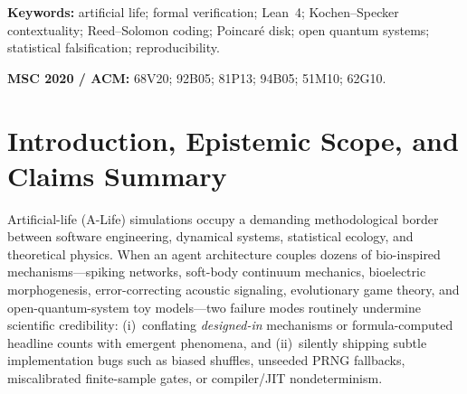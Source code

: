 \documentclass[11pt,a4paper]{article}
\numberwithin{equation}{section}
\theoremstyle{plain}
\theoremstyle{definition}
\theoremstyle{remark}
\newcommand{\code}[1]{{\ttfamily\footnotesize\def\_{\textunderscore\penalty0\hskip0pt}#1}}
\begin{document}
\begin{abstract}
\begin{enumerate}[leftmargin=1.8em,itemsep=2pt]
  \item \emph{Strict Epistemic Honesty:} A systematic cross-check against all $1{,}900$ open problems in \code{0thernes/unsolved-problems-mega-atlas} establishes honestly that Glitchling solves \emph{zero} ($0/1{,}900$) open problems. No claims of consciousness, sentience, AGI, or physical quantum biology are made.
\end{enumerate}
\end{abstract}

\medskip
\noindent\textbf{Keywords:} artificial life; formal verification; Lean~4; Kochen--Specker contextuality; Reed--Solomon coding; Poincar\'e disk; open quantum systems; statistical falsification; reproducibility.

\smallskip
\noindent\textbf{MSC 2020 / ACM:} 68V20; 92B05; 81P13; 94B05; 51M10; 62G10.

\tableofcontents

\section{Introduction, Epistemic Scope, and Claims Summary}
\label{sec:intro}

Artificial-life (A-Life) simulations occupy a demanding methodological border between software engineering, dynamical systems, statistical ecology, and theoretical physics. When an agent architecture couples dozens of bio-inspired mechanisms---spiking networks, soft-body continuum mechanics, bioelectric morphogenesis, error-correcting acoustic signaling, evolutionary game theory, and open-quantum-system toy models---two failure modes routinely undermine scientific credibility: (i)~conflating \emph{designed-in} mechanisms or formula-computed headline counts with emergent phenomena, and (ii)~silently shipping subtle implementation bugs such as biased shuffles, unseeded PRNG fallbacks, miscalibrated finite-sample gates, or compiler/JIT nondeterminism.
\end{document}
